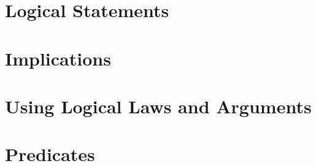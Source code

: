 \section{Logical Statements}
    
\clearpage

\section{Implications}
    
\clearpage

\section{Using Logical Laws and Arguments}
    
\clearpage

\section{Predicates}
    
